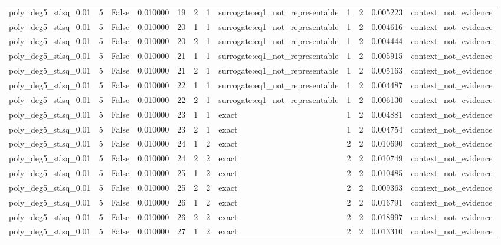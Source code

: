 \begin{tabular}{lrrrrrrlrrrl}
poly\_deg5\_stlsq\_0.01 & 5 & False & 0.010000 & 19 & 2 & 1 & surrogate:eq1\_not\_representable & 1 & 2 & 0.005223 & context\_not\_evidence \\
poly\_deg5\_stlsq\_0.01 & 5 & False & 0.010000 & 20 & 1 & 1 & surrogate:eq1\_not\_representable & 1 & 2 & 0.004616 & context\_not\_evidence \\
poly\_deg5\_stlsq\_0.01 & 5 & False & 0.010000 & 20 & 2 & 1 & surrogate:eq1\_not\_representable & 1 & 2 & 0.004444 & context\_not\_evidence \\
poly\_deg5\_stlsq\_0.01 & 5 & False & 0.010000 & 21 & 1 & 1 & surrogate:eq1\_not\_representable & 1 & 2 & 0.005915 & context\_not\_evidence \\
poly\_deg5\_stlsq\_0.01 & 5 & False & 0.010000 & 21 & 2 & 1 & surrogate:eq1\_not\_representable & 1 & 2 & 0.005163 & context\_not\_evidence \\
poly\_deg5\_stlsq\_0.01 & 5 & False & 0.010000 & 22 & 1 & 1 & surrogate:eq1\_not\_representable & 1 & 2 & 0.004487 & context\_not\_evidence \\
poly\_deg5\_stlsq\_0.01 & 5 & False & 0.010000 & 22 & 2 & 1 & surrogate:eq1\_not\_representable & 1 & 2 & 0.006130 & context\_not\_evidence \\
poly\_deg5\_stlsq\_0.01 & 5 & False & 0.010000 & 23 & 1 & 1 & exact & 1 & 2 & 0.004881 & context\_not\_evidence \\
poly\_deg5\_stlsq\_0.01 & 5 & False & 0.010000 & 23 & 2 & 1 & exact & 1 & 2 & 0.004754 & context\_not\_evidence \\
poly\_deg5\_stlsq\_0.01 & 5 & False & 0.010000 & 24 & 1 & 2 & exact & 2 & 2 & 0.010690 & context\_not\_evidence \\
poly\_deg5\_stlsq\_0.01 & 5 & False & 0.010000 & 24 & 2 & 2 & exact & 2 & 2 & 0.010749 & context\_not\_evidence \\
poly\_deg5\_stlsq\_0.01 & 5 & False & 0.010000 & 25 & 1 & 2 & exact & 2 & 2 & 0.010485 & context\_not\_evidence \\
poly\_deg5\_stlsq\_0.01 & 5 & False & 0.010000 & 25 & 2 & 2 & exact & 2 & 2 & 0.009363 & context\_not\_evidence \\
poly\_deg5\_stlsq\_0.01 & 5 & False & 0.010000 & 26 & 1 & 2 & exact & 2 & 2 & 0.016791 & context\_not\_evidence \\
poly\_deg5\_stlsq\_0.01 & 5 & False & 0.010000 & 26 & 2 & 2 & exact & 2 & 2 & 0.018997 & context\_not\_evidence \\
poly\_deg5\_stlsq\_0.01 & 5 & False & 0.010000 & 27 & 1 & 2 & exact & 2 & 2 & 0.013310 & context\_not\_evidence \\

\end{tabular}
